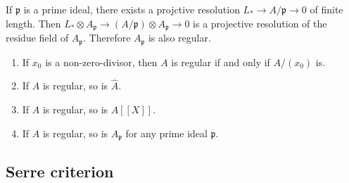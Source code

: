 \documentclass[leqno]{amsart}
\newcommand{\1}{\mathbf{1}}
\newcommand{\fp}{\mathfrak p}
\theoremstyle{definition}
\theoremstyle{remark}
\begin{document}
If $\fp$ is a prime ideal,
there exists a projctive resolution
$L_*\to A/\fp\to 0$ of finite length.
Then $L_*\otimes A_\fp\to (A/\fp)\otimes A_\fp\to 0$
is a projective resolution of the residue field of $A_\fp$.
Therefore  $A_\fp$ is also regular.

\begin{enumerate}
	\item If $x_0$ is a non-zero-divisor, then
		 $A$ is regular if and only if 
		 $A/(x_0)$ is.
	 \item If $A$ is regular, so is $\hat{A}$.
	 \item If $A$ is regular, so is $A[[X]]$.
	 \item If $A$ is regular, so is $A_\fp$
		 for any prime ideal $\fp$.
\end{enumerate}

\subsection{Serre criterion}
\end{document}
